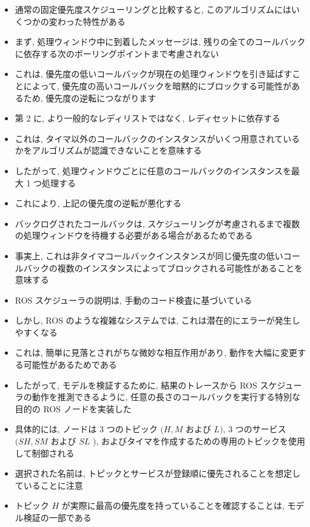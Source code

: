 \begin{frame}{}
    \begin{itemize}
        \item 通常の固定優先度スケジューリングと比較すると, このアルゴリズムにはいくつかの変わった特性がある
\item まず, 処理ウィンドウ中に到着したメッセージは, 残りの全てのコールバックに依存する次のポーリングポイントまで考慮されない
\item これは, 優先度の低いコールバックが現在の処理ウィンドウを引き延ばすことによって, 優先度の高いコールバックを暗黙的にブロックする可能性があるため, 優先度の逆転につながります
    \end{itemize}
\end{frame}

\begin{frame}{}
    \begin{itemize}
        \item 第 2 に, より一般的なレディリストではなく, レディセットに依存する
\item これは, タイマ以外のコールバックのインスタンスがいくつ用意されているかをアルゴリズムが認識できないことを意味する
\item したがって, 処理ウィンドウごとに任意のコールバックのインスタンスを最大 1 つ処理する
\item これにより, 上記の優先度の逆転が悪化する
\item バックログされたコールバックは, スケジューリングが考慮されるまで複数の処理ウィンドウを待機する必要がある場合があるためである
\item 事実上, これは非タイマコールバックインスタンスが同じ優先度の低いコールバックの複数のインスタンスによってブロックされる可能性があることを意味する
    \end{itemize}
\end{frame}

\begin{frame}{}
    \begin{itemize}
        \item ROS スケジューラの説明は, 手動のコード検査に基づいている
\item しかし, ROS のような複雑なシステムでは, これは潜在的にエラーが発生しやすくなる
\item これは, 簡単に見落とされがちな微妙な相互作用があり, 動作を大幅に変更する可能性があるためである
\item したがって, モデルを検証するために, 結果のトレースから ROS スケジューラの動作を推測できるように, 任意の長さのコールバックを実行する特別な目的の ROS ノードを実装した
\item 具体的には, ノードは 3 つのトピック $(H, M$ および $L)$, 3 つのサービス $(S H, S M$ および $S L$ ), およびタイマを作成するための専用のトピックを使用して制御される
\item 選択された名前は, トピックとサービスが登録順に優先されることを想定していることに注意
\item トピック $H$ が実際に最高の優先度を持っていることを確認することは, モデル検証の一部である
    \end{itemize}
\end{frame}

